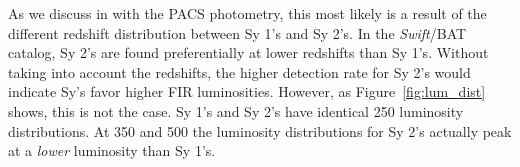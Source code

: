 As we discuss in \citet{Melendez:2014yu} with the PACS photometry, this most likely is a result of the different redshift distribution between Sy 1's and Sy 2's. In the \textit{Swift}/BAT catalog, Sy 2's are found preferentially at lower redshifts than Sy 1's. Without taking into account the redshifts, the higher detection rate for Sy 2's would indicate Sy's favor higher FIR luminosities. However, as Figure~\ref{fig:lum_dist} shows, this is not the case. Sy 1's and Sy 2's have identical 250 \um{} luminosity distributions. At 350 and 500 \um{} the luminosity distributions for Sy 2's actually peak at a \textit{lower} luminosity than Sy 1's. 